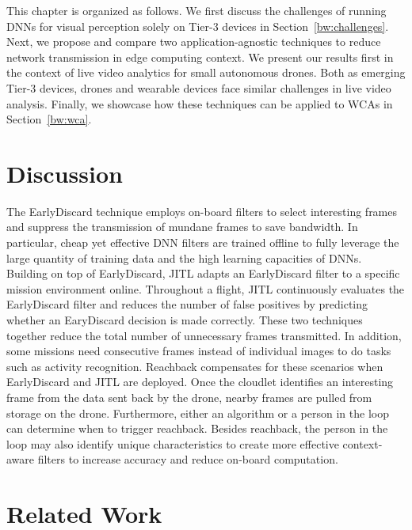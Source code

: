 This chapter is organized as follows. We first discuss the challenges of running
DNNs for visual perception solely on Tier-3 devices in
Section~\ref{bw:challenges}. Next, we propose and compare two
application-agnostic techniques to reduce network transmission in edge computing
context. We present our results first in the context of live video analytics for
small autonomous drones. Both as emerging Tier-3 devices, drones and wearable
devices face similar challenges in live video analysis. Finally, we showcase how
these techniques can be applied to WCAs in Section~\ref{bw:wca}.







\section{Discussion}
\label{bw:discussion}

The EarlyDiscard technique employs on-board filters to select interesting
frames and suppress the transmission of mundane frames to save bandwidth. In
particular, cheap yet effective DNN filters are trained offline to fully
leverage the large quantity of training data and the high learning capacities of
DNNs. Building on top of EarlyDiscard, JITL adapts an EarlyDiscard filter to a
specific mission environment online. Throughout a flight, JITL continuously
evaluates the EarlyDiscard filter and reduces the number of false positives by
predicting whether an EaryDiscard decision is made correctly. These two
techniques together reduce the total number of unnecessary frames transmitted.
In addition, some missions need consecutive frames instead of individual images
to do tasks such as activity recognition. Reachback compensates for these
scenarios when EarlyDiscard and JITL are deployed. Once the cloudlet identifies
an interesting frame from the data sent back by the drone, nearby frames are
pulled from storage on the drone. Furthermore, either an algorithm or a person
in the loop can determine when to trigger reachback. Besides reachback, the
person in the loop may also identify unique characteristics to create more
effective context-aware filters to increase accuracy and reduce on-board
computation.

\section{Related Work}
\label{bw:relatedwork}

